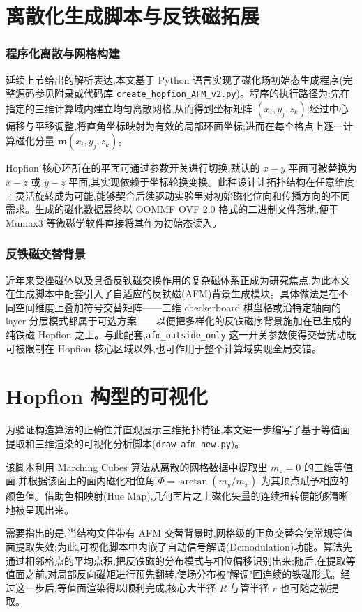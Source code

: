 \documentclass{article}
\begin{document}
\section{离散化生成脚本与反铁磁拓展}

\subsubsection*{程序化离散与网格构建}
延续上节给出的解析表达,本文基于 Python 语言实现了磁化场初始态生成程序(完整源码参见附录或代码库 \texttt{create\_hopfion\_AFM\_v2.py})。程序的执行路径为:先在指定的三维计算域内建立均匀离散网格,从而得到坐标矩阵 $(x_i, y_j, z_k)$;经过中心偏移与平移调整,将直角坐标映射为有效的局部环面坐标;进而在每个格点上逐一计算磁化分量 $\mathbf{m}(x_i, y_j, z_k)$。

Hopfion 核心环所在的平面可通过参数开关进行切换,默认的 $x-y$ 平面可被替换为 $x-z$ 或 $y-z$ 平面,其实现依赖于坐标轮换变换。此种设计让拓扑结构在任意维度上灵活旋转成为可能,能够契合后续驱动实验里对初始磁化位向和传播方向的不同需求。生成的磁化数据最终以 OOMMF OVF 2.0 格式的二进制文件落地,便于 Mumax3 等微磁学软件直接将其作为初始态读入。

\subsubsection*{反铁磁交替背景}
近年来受挫磁体以及具备反铁磁交换作用的复杂磁体系正成为研究焦点,为此本文在生成脚本中配套引入了自适应的反铁磁(AFM)背景生成模块。具体做法是在不同空间维度上叠加符号交替矩阵——三维 checkerboard 棋盘格或沿特定轴向的 layer 分层模式都属于可选方案——以便把多样化的反铁磁序背景施加在已生成的纯铁磁 Hopfion 之上。与此配套,\texttt{afm\_outside\_only} 这一开关参数使得交替扰动既可被限制在 Hopfion 核心区域以外,也可作用于整个计算域实现全局交错。

\section{Hopfion 构型的可视化}

为验证构造算法的正确性并直观展示三维拓扑特征,本文进一步编写了基于等值面提取和三维渲染的可视化分析脚本(\texttt{draw\_afm\_new.py})。

该脚本利用 Marching Cubes 算法从离散的网格数据中提取出 $m_z=0$ 的三维等值面,并根据该面上的面内磁化相位角 $\Phi = \arctan(m_y/m_x)$ 为其顶点赋予相应的颜色值。借助色相映射(Hue Map),几何面片之上磁化矢量的连续扭转便能够清晰地被呈现出来。

需要指出的是,当结构文件带有 AFM 交替背景时,网格级的正负交替会使常规等值面提取失效;为此,可视化脚本中内嵌了自动信号解调(Demodulation)功能。算法先通过相邻格点的平均点积,把反铁磁的分布模式与相位偏移识别出来;随后,在提取等值面之前,对局部反向磁矩进行预先翻转,使场分布被"解调"回连续的铁磁形式。经过这一步后,等值面渲染得以顺利完成,核心大半径 $R$ 与管半径 $r$ 也可随之被提取。
\end{document}
